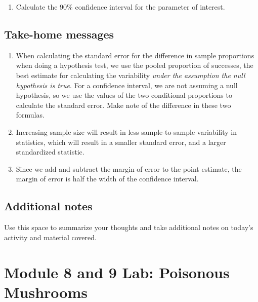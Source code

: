 \documentclass[
]{report}
\providecommand{\tightlist}{%
  \setlength{\itemsep}{0pt}\setlength{\parskip}{0pt}}
\begin{document}
\begin{enumerate}
\def\labelenumi{\arabic{enumi}.}
\setcounter{enumi}{13}
\tightlist
\item
  Calculate the 90\% confidence interval for the parameter of interest.
\end{enumerate}

\vspace{1in}

\subsection{Take-home messages}\label{take-home-messages-19}

\begin{enumerate}
\def\labelenumi{\arabic{enumi}.}
\item
  When calculating the standard error for the difference in sample proportions when doing a hypothesis test, we use the pooled proportion of successes, the best estimate for calculating the variability \emph{under the assumption the null hypothesis is true}. For a confidence interval, we are not assuming a null hypothesis, so we use the values of the two conditional proportions to calculate the standard error. Make note of the difference in these two formulas.
\item
  Increasing sample size will result in less sample-to-sample variability in statistics, which will result in a smaller standard error, and a larger standardized statistic.
\item
  Since we add and subtract the margin of error to the point estimate, the margin of error is half the width of the confidence interval.
\end{enumerate}

\subsection{Additional notes}\label{additional-notes-19}

Use this space to summarize your thoughts and take additional notes on today's activity and material covered.

\newpage

\section{Module 8 and 9 Lab: Poisonous Mushrooms}\label{module-8-and-9-lab-poisonous-mushrooms}

\end{document}
